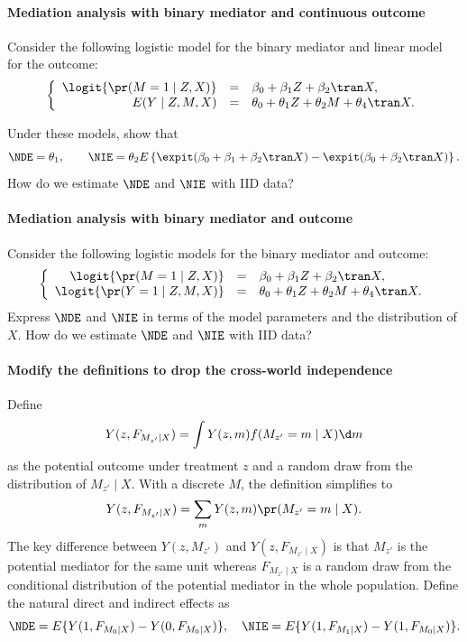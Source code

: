\paragraph{Mediation analysis with binary mediator and continuous outcome}\label{para::logit-binary-m}
Consider the following logistic model for the binary mediator and linear model for the outcome:
$$
\left\{\begin{array}{rcl}
\logit\{ \pr(M  = 1\mid Z, X) \}&=&  \beta_0 + \beta_1 Z + \beta_2\tran X, \\
E(Y\mid Z,M,X) &=& \theta_0 + \theta_1 Z + \theta_2 M +   \theta_4\tran X . 
\end{array}\right.
$$


Under these models, show that 
$$
\NDE = \theta_1  ,\qquad
\NIE = \theta_2 E \left\{  \expit(\beta_0 + \beta_1  + \beta_2\tran X)
-  \expit(\beta_0   + \beta_2\tran X)  \right\}. 
$$
How do we estimate $\NDE$ and $\NIE$ with IID data?






\paragraph{Mediation analysis with binary mediator and outcome}
\label{para::mediation-binaryMY}

Consider the following logistic models for the binary mediator and outcome:
$$
\left\{\begin{array}{rcl}
\logit\{ \pr(M  = 1\mid Z, X) \}&=&  \beta_0 + \beta_1 Z + \beta_2\tran X, \\
\logit \{ \pr(Y = 1 \mid Z,M,X ) \} &=& \theta_0 + \theta_1 Z + \theta_2 M +   \theta_4\tran X.
\end{array}\right.
$$
Express $\NDE$ and $\NIE$ in terms of the model parameters and the distribution of $X$. How do we estimate $\NDE$ and $\NIE$ with IID data?



  
\paragraph{Modify the definitions to drop the cross-world independence}\label{problem::no-crossworld-modification}


Define 
$$
Y(z, F_{M_{z'}\mid X}) = \int Y(z,m) f(M_{z'} = m\mid X) \d m
$$
as the potential outcome under treatment $z$ and a random draw from the distribution of $M_{z'}\mid X$. 
With a discrete $M$, the definition simplifies to
$$
Y(z, F_{M_{z'}\mid X}) =\sum_m Y(z,m) \pr(M_{z'} = m\mid X).
$$
The key difference between $Y(z,M_{z'})$ and $Y(z, F_{M_{z'}\mid X}) $ is that $M_{z'}$ is the potential mediator for the same unit whereas $F_{M_{z'}\mid X}$ is a random draw from the conditional distribution of the potential mediator in the whole population. 
Define the natural direct and indirect effects as
$$
\NDE = E\{Y(1, F_{M_{0}\mid X})  - Y(0, F_{M_{0}\mid X})   \},\quad
\NIE  =  E\{Y(1, F_{M_{1}\mid X})  - Y(1, F_{M_{0}\mid X})   \}.
$$


